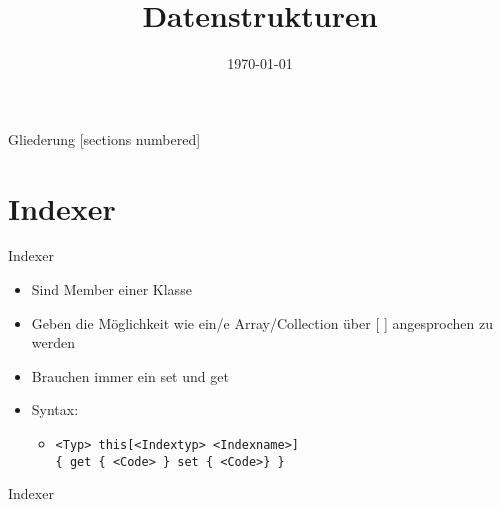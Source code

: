 



\title{Datenstrukturen}
\date{\today}




\maketitle

\begin{frame}{Gliederung}
	[sections numbered]
	\tableofcontents
\end{frame}

\section{Indexer}
\begin{frame}{Indexer}
	\begin{itemize}
		\item Sind Member einer Klasse
		\item Geben die Möglichkeit wie ein/e Array/Collection über \alert{[ ]} angesprochen zu werden
		\item Brauchen immer ein \alert{set} und \alert{get}
		\item Syntax:
		\begin{itemize}
			\item \texttt{\alert{<Typ>} this[\alert{<Indextyp> <Indexname>}]\\ \{ get \{ \alert{<Code>} \} set \{ \alert{<Code>}\} \}}
		\end{itemize}
	\end{itemize}
\end{frame}

\begin{frame}{Indexer}
	
\end{frame}

